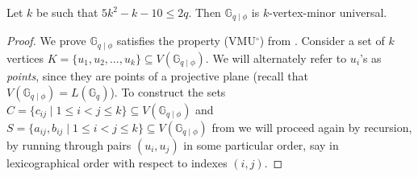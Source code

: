 \documentclass[a4paper,UKenglish,cleveref, autoref, thm-restate]{arxiv}
\newcommand{\ls}{\leqslant}
\newcommand{\G}[1][q]{\mathbb{G}_{#1}}
\newcommand{\Gphi}[1][q]{\mathbb{G}_{#1\mid\phi}}
\begin{document}
\begin{theorem}
\label{theo:reduced-vmu}
    Let $k$ be such that $5k^2 -k -10 \ls 2q$. Then $\Gphi$ is $k$-vertex-minor universal.
\end{theorem}
\begin{proof}
    We prove $\Gphi$ satisfies the property (VMU$^\circ$) from . Consider a set of $k$  vertices  $K = \{u_1, u_2, \dots, u_k\} \subseteq V(\Gphi)$. We will alternately refer to $u_i$'s as \emph{points}, since they are points of a projective plane (recall that $V(\Gphi) = L(\G)$). To construct the sets  $C = \{c_{ij} \mid 1 \ls i < j \ls k \} \subseteq V(\Gphi)$ and
    $S = \{a_{ij},b_{ij} \mid 1 \ls i < j \ls k \} \subseteq V(\Gphi)$ from  we will proceed again by recursion, by running through pairs $(u_i, u_j)$ in some particular order, say in lexicographical order with respect to indexes $(i,j)$.


\end{proof}
\end{document}
